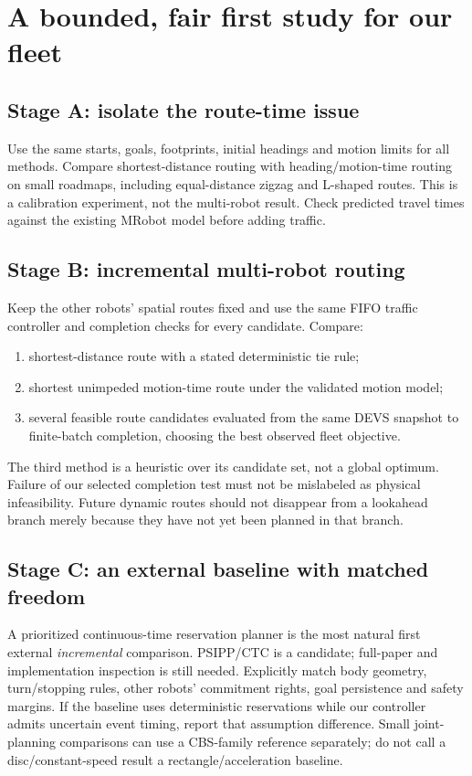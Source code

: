 \documentclass[11pt,a4paper]{article}
\begin{document}
\clearpage
\section{A bounded, fair first study for our fleet}
\subsection*{Stage A: isolate the route-time issue}
Use the same starts, goals, footprints, initial headings and motion limits for
all methods. Compare shortest-distance routing with heading/motion-time routing
on small roadmaps, including equal-distance zigzag and L-shaped routes. This
is a calibration experiment, not the multi-robot result. Check predicted travel
times against the existing MRobot model before adding traffic.

\subsection*{Stage B: incremental multi-robot routing}
Keep the other robots' spatial routes fixed and use the same FIFO traffic
controller and completion checks for every candidate. Compare:
\begin{enumerate}
\item shortest-distance route with a stated deterministic tie rule;
\item shortest unimpeded motion-time route under the validated motion model;
\item several feasible route candidates evaluated from the same DEVS snapshot
to finite-batch completion, choosing the best observed fleet objective.
\end{enumerate}
The third method is a heuristic over its candidate set, not a global optimum.
Failure of our selected completion test must not be mislabeled as physical
infeasibility. Future dynamic routes should not disappear from a lookahead
branch merely because they have not yet been planned in that branch.

\subsection*{Stage C: an external baseline with matched freedom}
A prioritized continuous-time reservation planner is the most natural first
external \emph{incremental} comparison. PSIPP/CTC is a candidate; full-paper
and implementation inspection is still needed. Explicitly match body geometry,
turn/stopping rules, other robots' commitment rights, goal persistence and
safety margins. If the baseline uses deterministic reservations while our
controller admits uncertain event timing, report that assumption difference.
Small joint-planning comparisons can use a CBS-family reference separately;
do not call a disc/constant-speed result a rectangle/acceleration baseline.
\end{document}
